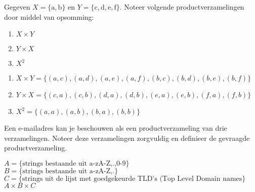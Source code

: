 \begin{oef}
Gegeven $X = \{\mathrm{a},\mathrm{ b}\}$ en $Y = \{\mathrm{c}, \mathrm{d}, \mathrm{e}, \mathrm{f}\}$. Noteer volgende productverzamelingen door middel van opsomming:
\begin{enumerate}
\item $X\times Y$
\item $Y\times X$
\item $X^2$
\end{enumerate}
\begin{opl}
\begin{enumerate}
\item $X\times Y=\{(a,c),(a,d),(a,e),(a,f),(b,c),(b,d),(b,e),(b,f) \}$
\item $Y\times X=\{(c,a),(c,b),(d,a),(d,b),(e,a),(e,b),(f,a),(f,b) \}$
\item $X^2=\{(a,a),(a,b),(b,a),(b,b) \}$
\end{enumerate}
\end{opl}
\end{oef}

\begin{oef}
Een e-mailadres kan je beschouwen als  een productverzameling van drie verzamelingen. Noteer deze verzamelingen zorgvuldig en definieer de gevraagde productverzameling.
\begin{opl}
$A=\{\text{strings bestaande uit a-zA-Z,.,0-9} \}$\\
$B=\{\text{strings bestaande uit a-zA-Z,.} \}$\\
$C=\{ \text{strings uit de lijst met goedgekeurde TLD's (Top Level Domain names}\}$\\
$A\times B\times C$
\end{opl}
\end{oef}

